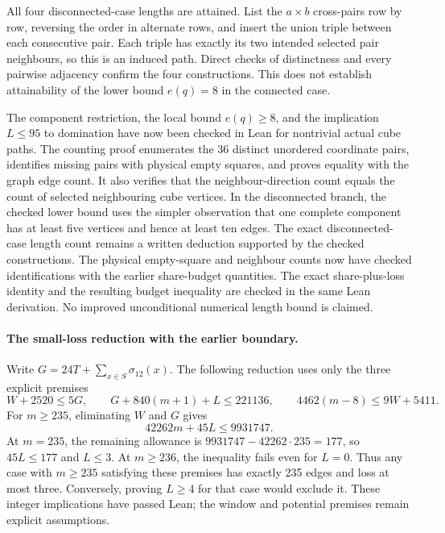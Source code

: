 \documentclass[11pt,a4paper]{article}
\theoremstyle{definition}
\theoremstyle{remark}
\begin{document}
All four disconnected-case lengths are attained. List the $a\times b$
cross-pairs row by row, reversing the order in alternate rows, and insert
the union triple between each consecutive pair. Each triple has exactly
its two intended selected pair neighbours, so this is an induced path.
Direct checks of distinctness and every pairwise adjacency confirm the
four constructions. This does not establish attainability of the lower
bound $e(q)=8$ in the connected case.

The component restriction, the local bound $e(q)\ge8$, and the implication
$L\le95$ to domination have now been checked in Lean for nontrivial actual
cube paths. The counting proof enumerates the 36 distinct unordered
coordinate pairs, identifies missing pairs with physical empty squares,
and proves equality with the graph edge count. It also verifies that the
neighbour-direction count equals the count of selected neighbouring cube
vertices. In the disconnected branch, the checked lower bound uses the
simpler observation that one complete component has at least five vertices
and hence at least ten edges. The exact disconnected-case length count
remains a written deduction supported by the checked constructions.
The physical empty-square and neighbour counts now have checked
identifications with the earlier share-budget quantities. The exact
share-plus-loss identity and the resulting budget inequality are checked
in the same Lean derivation.
No improved unconditional numerical length bound is claimed.

\paragraph{The small-loss reduction with the earlier boundary.}
Write $G=24T+\sum_{x\in S}\sigma_{12}(x)$. The following reduction uses
only the three explicit premises
\[
W+2520\le5G,\qquad G+840(m+1)+L\le221136,\qquad
4462(m-8)\le9W+5411.
\]
For $m\ge235$, eliminating $W$ and $G$ gives
\[
42262m+45L\le9931747.
\]
At $m=235$, the remaining allowance is
$9931747-42262\cdot235=177$, so $45L\le177$ and $L\le3$.
At $m\ge236$, the inequality fails even for $L=0$.
Thus any case with $m\ge235$ satisfying these premises has exactly
235 edges and loss at most three. Conversely, proving $L\ge4$ for that
case would exclude it. These integer implications have passed Lean;
the window and potential premises remain explicit assumptions.
\end{document}
